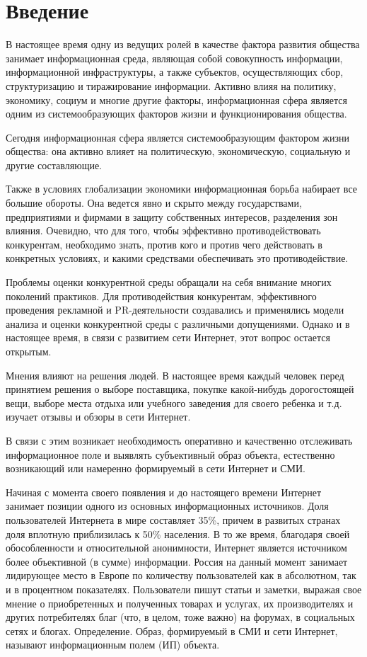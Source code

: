 \documentclass[a4paper,14pt,russian]{extreport}
\begin{document}
\chapter*{Введение}
В настоящее время одну из ведущих ролей в качестве фактора развития общества занимает информационная среда, являющая собой совокупность информации, информационной инфраструктуры, а также субъектов, осуществляющих сбор, структуризацию и тиражирование информации. Активно влияя на политику, экономику, социум и многие другие факторы, информационная сфера является одним из системообразующих факторов жизни и функционирования общества.

Сегодня информационная сфера является системообразующим фактором жизни общества: она активно влияет на политическую, экономическую, социальную и другие составляющие.

Также в условиях глобализации экономики информационная борьба набирает все большие обороты. Она ведется явно и скрыто между государствами, предприятиями и фирмами в защиту собственных интересов, разделения зон влияния. Очевидно, что для того, чтобы эффективно противодействовать конкурентам, необходимо знать, против кого и против чего действовать в конкретных условиях, и какими средствами обеспечивать это противодействие.

Проблемы оценки конкурентной среды обращали на себя внимание многих поколений практиков. Для противодействия конкурентам, эффективного проведения рекламной и PR-деятельности создавались и применялись модели анализа и оценки конкурентной среды с различными допущениями. Однако и в настоящее время, в связи с развитием сети Интернет, этот вопрос остается открытым.

Мнения влияют на решения людей. В настоящее время каждый человек перед принятием решения о выборе поставщика, покупке какой-нибудь дорогостоящей вещи, выборе места отдыха или учебного заведения для своего ребенка и т.д. изучает отзывы и обзоры в сети Интернет.

В связи с этим возникает необходимость оперативно и качественно отслеживать информационное поле и выявлять субъективный образ объекта, естественно возникающий или намеренно формируемый в сети Интернет и СМИ.

Начиная с момента своего появления и до настоящего времени Интернет занимает позиции одного из основных информационных источников. Доля пользователей Интернета в мире составляет 35\%, причем в развитых странах доля вплотную приблизилась к 50\% населения.  В то же время, благодаря своей обособленности и относительной анонимности, Интернет является источником более объективной (в сумме) информации. Россия на данный момент занимает лидирующее место в Европе по количеству пользователей как в абсолютном, так и в процентном показателях. Пользователи пишут статьи и заметки, выражая свое мнение о приобретенных и полученных товарах и услугах, их производителях и других потребителях благ (что, в целом, тоже важно) на форумах, в социальных сетях и блогах.
Определение. Образ, формируемый в СМИ и сети Интернет, называют информационным полем \mbox{(ИП)} объекта.
\end{document}
